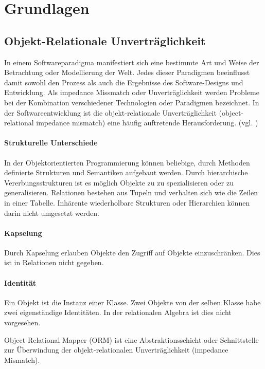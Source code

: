 \section{Grundlagen}
 
\subsection{Objekt-Relationale Unverträglichkeit}
  
In einem Softwareparadigma manifestiert sich eine bestimmte Art und Weise der Betrachtung oder Modellierung der Welt. 
Jedes dieser Paradigmen beeinflusst damit sowohl den Prozess als auch die Ergebnisse des Software-Designs
und Entwicklung. Als impedance Missmatch oder Unverträglichkeit werden Probleme bei der Kombination verschiedener Technologien oder Paradigmen bezeichnet. 
In der Softwareentwicklung ist die objekt-relationale Unverträglichkeit (object-relational impedance mismatch) eine häufig auftretende Herausforderung. (vgl. \cite{ireland2009classification})

\paragraph{Strukturelle Unterschiede} In der Objektorientierten Programmierung können beliebige, durch Methoden definierte Strukturen und Semantiken aufgebaut werden. Durch hierarchische Vererbungsstrukturen ist es möglich Objekte zu zu spezialisieren oder zu generalisieren. Relationen bestehen aus Tupeln und verhalten sich wie die Zeilen in einer Tabelle. Inhärente wiederholbare Strukturen oder Hierarchien können darin nicht umgesetzt werden. 

\paragraph{Kapselung}
Durch Kapselung erlauben Objekte den Zugriff auf Objekte einzuschränken. Dies ist in Relationen nicht gegeben.

\paragraph{Identität}
Ein Objekt ist die Instanz einer Klasse. Zwei Objekte von der selben Klasse habe zwei eigenständige Identitäten. In der relationalen Algebra ist dies nicht vorgesehen.





    
    Object Relational Mapper (ORM) ist eine Abstraktionsschicht oder Schnittstelle zur Überwindung der objekt-relationalen Unverträglichkeit (impedance Mismatch).  
    
